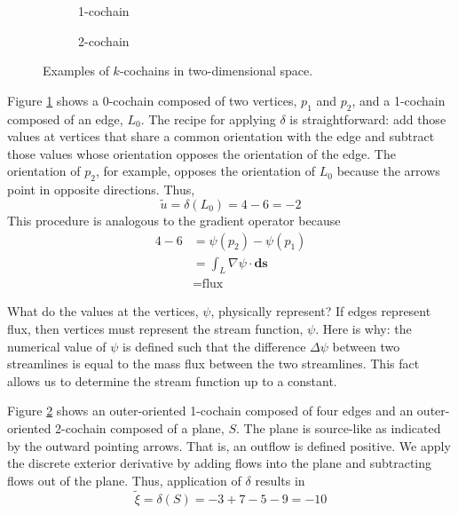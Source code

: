 \begin{figure}[ht]
\begin{subfigure}[c]{0.3\textwidth}
{
            \vfill
        }
        \caption{1-cochain}
        \label{fig:outer1CochainExample}
    \end{subfigure}
    \begin{subfigure}[c]{0.3\textwidth}
        \centering
        \usebox{\boxOuterExample}
        \caption{2-cochain}
        \label{fig:outer2CochainExample}
    \end{subfigure}
    \caption{Examples of $k$-cochains in two-dimensional space.}
    \label{fig:outerCochainExamples}
\end{figure}

Figure \ref{fig:outer1CochainExample} shows a 0-cochain composed of two vertices, $p_1$ and $p_2$, and a 1-cochain composed of an edge, $L_0$. The recipe for applying $\delta$ is straightforward: add those values at vertices that share a common orientation with the edge and subtract those values whose orientation opposes the orientation of the edge. The orientation of $p_2$, for example, opposes the orientation of $L_0$ because the arrows point in opposite directions. Thus,
\begin{equation}
    \tilde{u} = \delta(L_0) = 4 - 6 = -2
\end{equation}
This procedure is analogous to the gradient operator because
\begin{equation}
    \begin{split}
        4 - 6 &= \psi(p_2) - \psi(p_1) \\
        &= \int_{L} \nabla \psi \cdot \mathbf{ds} \\
        &= \mbox{flux}
    \end{split}
\end{equation}

What do the values at the vertices, $\psi$, physically represent? If edges represent flux, then vertices must represent the stream function, $\psi$. Here is why: the numerical value of $\psi$ is defined such that the difference $\Delta \psi$ between two streamlines is equal to the mass flux between the two streamlines. This fact allows us to determine the stream function up to a constant.

Figure \ref{fig:outer2CochainExample} shows an outer-oriented 1-cochain composed of four edges and an outer-oriented 2-cochain composed of a plane, $S$. The plane is source-like as indicated by the outward pointing arrows. That is, an outflow is defined positive. We apply the discrete exterior derivative by adding flows into the plane and subtracting flows out of the plane. Thus, application of $\delta$ results in
\begin{equation}
    \tilde{\xi} = \delta(S) = -3 + 7 - 5 - 9 = -10
\end{equation}

